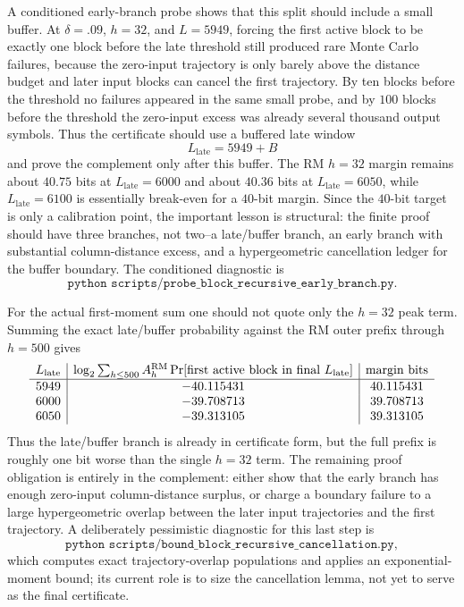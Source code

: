 A conditioned early-branch probe shows that this split should include a small buffer.  At \(\delta=.09\), \(h=32\),
and \(L=5949\), forcing the first active block to be exactly one block before the late threshold still produced rare
Monte Carlo failures, because the zero-input trajectory is only barely above the distance budget and later input blocks
can cancel the first trajectory.  By ten blocks before the threshold no failures appeared in the same small probe, and
by \(100\) blocks before the threshold the zero-input excess was already several thousand output symbols.  Thus the
certificate should use a buffered late window
\[
L_{\mathrm{late}}=5949+B
\]
and prove the complement only after this buffer.  The RM \(h=32\) margin remains about \(40.75\) bits at
\(L_{\mathrm{late}}=6000\) and about \(40.36\) bits at \(L_{\mathrm{late}}=6050\), while \(L_{\mathrm{late}}=6100\) is
essentially break-even for a \(40\)-bit margin.  Since the \(40\)-bit target is only a calibration point, the important
lesson is structural: the finite proof should have three branches, not two--a late/buffer branch, an early branch with
substantial column-distance excess, and a hypergeometric cancellation ledger for the buffer boundary.  The conditioned
diagnostic is
\[
\texttt{python scripts/probe\_block\_recursive\_early\_branch.py}.
\]

For the actual first-moment sum one should not quote only the \(h=32\) peak term.  Summing the exact late/buffer
probability against the RM outer prefix through \(h=500\) gives
\[
\begin{array}{c|c|c}
L_{\mathrm{late}} & \log_2\sum_{h\le 500}A_h^{\rm RM}\Pr[\text{first active block in final }L_{\mathrm{late}}]
& \text{margin bits}\\
\hline
5949 & -40.115431 & 40.115431\\
6000 & -39.708713 & 39.708713\\
6050 & -39.313105 & 39.313105
\end{array}
\]
Thus the late/buffer branch is already in certificate form, but the full prefix is roughly one bit worse than the
single \(h=32\) term.  The remaining proof obligation is entirely in the complement: either show that the early branch
has enough zero-input column-distance surplus, or charge a boundary failure to a large hypergeometric overlap between
the later input trajectories and the first trajectory.  A deliberately pessimistic diagnostic for this last step is
\[
\texttt{python scripts/bound\_block\_recursive\_cancellation.py},
\]
which computes exact trajectory-overlap populations and applies an exponential-moment bound; its current role is to
size the cancellation lemma, not yet to serve as the final certificate.

